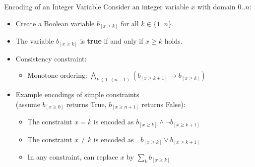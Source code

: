 \documentclass{cons-beamer}
\begin{document}
\begin{frame}{ Encoding of an Integer Variable}
  Consider an integer variable $x$ with domain $0..n$: \vfill
  \begin{itemize}
    \item Create a Boolean variable $b_{[x \geq k]}$ for all $k \in \{1..n\}$. \vfill
    \item The variable $b_{[x \geq k]}$ is \textbf{true} if and only if
      $x \geq k$ holds. \vfill
    \item Consistency constraint: \vfill
	  \begin{itemize}
        \item Monotone ordering: $\displaystyle\bigwedge_{k \in 1..(n-1)} \left(b_{[x \geq k+1]} \rightarrow b_{[x \geq k]} \right)$
      \end{itemize} \vfill
    \item Example encodings of simple constraints \\
	      (assume $b_{[x \geq 0]}$ returns True, $b_{[x \geq n+1]}$ returns False):
      \begin{itemize}
        \item The constraint $x = k$ is encoded as
          $b_{[x \geq k]} \land \lnot b_{[x \geq k+1]}$ \vfill
        \item The constraint $x \neq k$ is encoded as
          $\lnot b_{[x \geq k]} \lor b_{[x \geq k+1]}$ \vfill
        \item In any constraint, can replace $x$ by $\sum_k b_{[x \geq k]}$
      \end{itemize}
  \end{itemize}
\end{frame}
\end{document}
